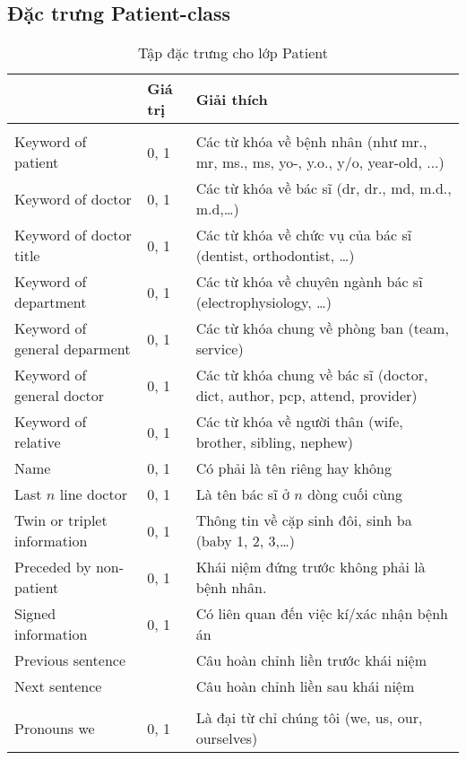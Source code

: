\subsection*{Đặc trưng Patient-class}
\begin{table}[t!]
\centering{}
\caption{Tập đặc trưng cho lớp Patient \label{tab:PatientFeatures}}
\footnotesize\sffamily

\begin{tabularx}{\textwidth}{@{\hspace{1em}}P{\raggedright}{0.3}lL@{}}
\toprule 
{} & \textbf{Giá trị} & \textbf{Giải thích}\\
\midrule
{}\\
Keyword of patient & 0, 1 & Các từ khóa về bệnh nhân (như mr., mr, ms., ms, yo-, y.o., y/o, year-old, ...)\\
Keyword of doctor & 0, 1 & Các từ khóa về bác sĩ (dr, dr., md, m.d., m.d,…)\\
Keyword of doctor title & 0, 1 & Các từ khóa về chức vụ của bác sĩ (dentist, orthodontist, …)\\
Keyword of department  & 0, 1 & Các từ khóa về chuyên ngành bác sĩ (electrophysiology, …)\\
Keyword of general deparment & 0, 1 & Các từ khóa chung về phòng ban (team, service)\\
Keyword of general doctor & 0, 1 & Các từ khóa chung về bác sĩ (doctor, dict, author, pcp, attend, provider)\\
Keyword of relative & 0, 1 & Các từ khóa về người thân (wife, brother, sibling, nephew)\\
Name & 0, 1 & Có phải là tên riêng hay không\\
Last $n$ line doctor & 0, 1 & Là tên bác sĩ ở $n$ dòng cuối cùng\\
Twin or triplet information & 0, 1 & Thông tin về cặp sinh đôi, sinh ba (baby 1, 2, 3,…)\\
Preceded by non-patient & 0, 1 & Khái niệm đứng trước không phải là bệnh nhân.\\
Signed information  & 0, 1 & Có liên quan đến việc kí/xác nhận bệnh án\\
Previous sentence &  & Câu hoàn chỉnh liền trước khái niệm\\
Next sentence &  & Câu hoàn chỉnh liền sau khái niệm\\
\\
Pronouns we & 0, 1 & Là đại từ chỉ chúng tôi (we, us, our, ourselves)\\

\end{tabularx}
\end{table}
